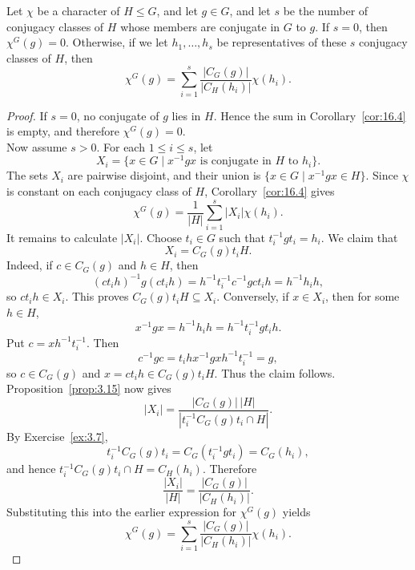 \documentclass[../Odyssey_Project.tex]{subfiles}
\begin{document}
\begin{proposition}
\label{prop:16.5}
Let $\chi$ be a character of $H \leq G$, and let $g \in G$, and let $s$ be the number of conjugacy classes of $H$ whose members are conjugate in $G$ to $g$. If $s = 0$, then $\chi^G(g) = 0$. Otherwise, if we let $h_1, \dots, h_s$ be representatives of these $s$ conjugacy classes of $H$, then
\[
\chi^G(g) = \sum_{i=1}^s \frac{|C_G(g)|}{|C_H(h_i)|} \chi(h_i).
\]
\end{proposition}

\begin{proof}
    If $s=0$, no conjugate of $g$ lies in $H$. Hence the sum in Corollary~\ref{cor:16.4} is empty, and therefore $\chi^G(g)=0$.\\
    Now assume $s>0$. For each $1\leq i\leq s$, let
    \[
        X_i
        =
        \{x\in G\mid x^{-1}gx\text{ is conjugate in }H\text{ to }h_i\}.
    \]
    The sets $X_i$ are pairwise disjoint, and their union is $\{x\in G\mid x^{-1}gx\in H\}$. Since $\chi$ is constant on each conjugacy class of $H$, Corollary~\ref{cor:16.4} gives
    \[
        \chi^G(g)
        =
        \frac{1}{|H|}
        \sum_{i=1}^{s}|X_i|\chi(h_i).
    \]
    It remains to calculate $|X_i|$. Choose $t_i\in G$ such that $t_i^{-1}gt_i=h_i$. We claim that
    \[
        X_i=C_G(g)t_iH.
    \]
    Indeed, if $c\in C_G(g)$ and $h\in H$, then
    \[
        (ct_ih)^{-1}g(ct_ih)
        =
        h^{-1}t_i^{-1}c^{-1}gct_ih
        =
        h^{-1}h_ih,
    \]
    so $ct_ih\in X_i$. This proves $C_G(g)t_iH\subseteq X_i$. Conversely, if $x\in X_i$, then for some $h\in H$,
    \[
        x^{-1}gx
        =
        h^{-1}h_ih
        =
        h^{-1}t_i^{-1}gt_ih.
    \]
    Put $c=xh^{-1}t_i^{-1}$. Then
    \[
        c^{-1}gc
        =
        t_ihx^{-1}gxh^{-1}t_i^{-1}
        =
        g,
    \]
    so $c\in C_G(g)$ and $x=ct_ih\in C_G(g)t_iH$. Thus the claim follows.\\
    Proposition~\ref{prop:3.15} now gives
    \[
        |X_i|
        =
        \frac{|C_G(g)|\,|H|}
        {|t_i^{-1}C_G(g)t_i\cap H|}.
    \]
    By Exercise~\ref{ex:3.7},
    \[
        t_i^{-1}C_G(g)t_i
        =
        C_G(t_i^{-1}gt_i)
        =
        C_G(h_i),
    \]
    and hence $t_i^{-1}C_G(g)t_i\cap H=C_H(h_i)$. Therefore
    \[
        \frac{|X_i|}{|H|}
        =
        \frac{|C_G(g)|}{|C_H(h_i)|}.
    \]
    Substituting this into the earlier expression for $\chi^G(g)$ yields
    \[
        \chi^G(g)
        =
        \sum_{i=1}^{s}
        \frac{|C_G(g)|}{|C_H(h_i)|}\chi(h_i).
    \]
\end{proof}
\end{document}
